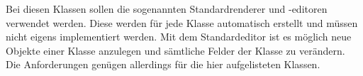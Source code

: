 Bei diesen Klassen sollen die sogenannten Standardrenderer und -editoren verwendet werden. Diese werden für jede Klasse automatisch erstellt und müssen nicht eigens implementiert werden.
Mit dem Standardeditor ist es möglich neue Objekte einer Klasse anzulegen und sämtliche Felder der Klasse zu verändern.
Die Anforderungen genügen allerdings für die hier aufgelisteten Klassen.

